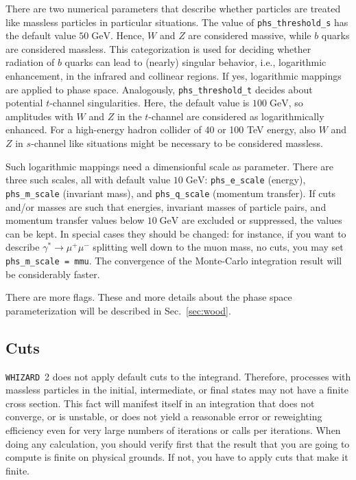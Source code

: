 \documentclass[12pt]{book}
\newcommand{\ttt}[1]{\texttt{#1}}
\newcommand{\whizard}{\ttt{WHIZARD}}
\newcommand{\GeV}{\textrm{GeV}}
\begin{document}
There are two numerical parameters that describe whether particles are treated
like massless particles in particular situations.  The value of
\verb|phs_threshold_s| has the default value $50\;\GeV$.  Hence, $W$ and $Z$
are considered massive, while $b$ quarks are considered massless.  This
categorization is used for deciding whether radiation of $b$ quarks can lead
to (nearly) singular behavior, i.e., logarithmic enhancement, in the infrared
and collinear regions.  If yes, logarithmic mappings are applied to phase
space.  Analogously, \verb|phs_threshold_t| decides about potential
$t$-channel singularities.  Here, the default value is $100\;\GeV$, so
amplitudes with $W$ and $Z$ in the $t$-channel are considered as
logarithmically enhanced. For a high-energy hadron collider of 40 or
100 TeV energy, also $W$ and $Z$ in $s$-channel like situations might
be necessary to be considered massless.

Such logarithmic mappings need a dimensionful scale as parameter.  There are
three such scales, all with default value $10\;\GeV$: \verb|phs_e_scale|
(energy), \verb|phs_m_scale| (invariant mass), and \verb|phs_q_scale|
(momentum transfer).  If cuts and/or masses are such that energies, invariant
masses of particle pairs, and momentum transfer values below $10\;\GeV$ are
excluded or suppressed, the values can be kept.  In special cases they should
be changed: for instance, if you want to describe $\gamma^*\to\mu^+\mu^-$
splitting well down to the muon mass, no cuts, you may set
\verb|phs_m_scale = mmu|.  The convergence of the Monte-Carlo integration
result will be considerably faster.

There are more flags. These and more details about the phase space
parameterization will be described in Sec.~\ref{sec:wood}.


\subsection{Cuts}

\whizard~2 does not apply default cuts to the integrand.  Therefore, processes
with massless particles in the initial, intermediate, or final states may not
have a finite cross section.  This fact will manifest itself in an integration
that does not converge, or is unstable, or does not yield a reasonable error
or reweighting efficiency even for very large numbers of iterations or calls
per iterations.  When doing any calculation, you should verify first that the
result that you are going to compute is finite on physical grounds.  If not,
you have to apply cuts that make it finite.
\end{document}
